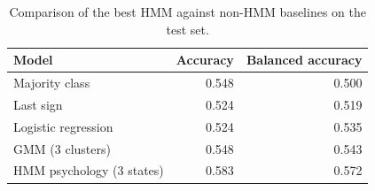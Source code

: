 \begin{table}
\caption{Comparison of the best HMM against non-HMM baselines on the test set.}
\label{tab:baselines}
\begin{tabular}{lrr}
\toprule
Model & Accuracy & Balanced accuracy \\
\midrule
Majority class & 0.548 & 0.500 \\
Last sign & 0.524 & 0.519 \\
Logistic regression & 0.524 & 0.535 \\
GMM (3 clusters) & 0.548 & 0.543 \\
HMM psychology (3 states) & 0.583 & 0.572 \\
\bottomrule
\end{tabular}
\end{table}
